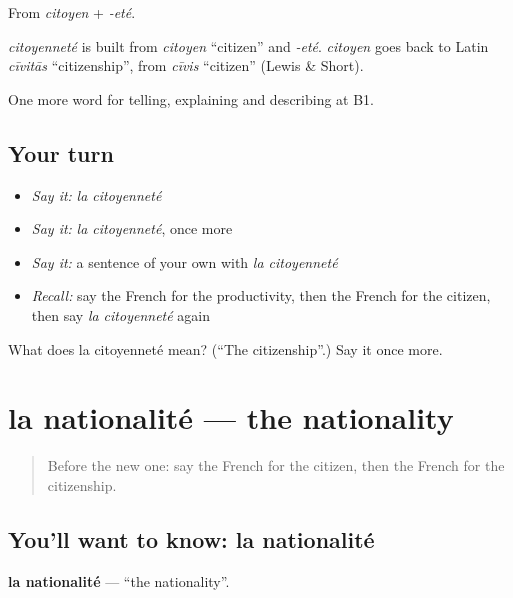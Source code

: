 From \emph{citoyen} + \emph{-eté}.

\begin{cousinweb}
\emph{citoyenneté} is built from \emph{citoyen} \textquotedblleft{}citizen\textquotedblright{} and \emph{-eté}. \emph{citoyen} goes back to Latin \emph{cīvitās} \textquotedblleft{}citizenship\textquotedblright{}, from \emph{cīvis} \textquotedblleft{}citizen\textquotedblright{} (Lewis \& Short).
\end{cousinweb}

\begin{grammarlens}[title={What you've built}]
One more word for telling, explaining and describing at B1.
\end{grammarlens}

\subsection*{Your turn}
\begin{itemize}
\raggedright
  \item \emph{Say it:} \emph{la citoyenneté}
  \item \emph{Say it:} \emph{la citoyenneté}, once more
  \item \emph{Say it:} a sentence of your own with \emph{la citoyenneté}
  \item \emph{Recall:} say the French for the productivity, then the French for the citizen, then say \emph{la citoyenneté} again
\end{itemize}

\begin{tcolorbox}[breakable,colback=teal!4,colframe=teal!35!black,title={Before you move on}]
What does la citoyenneté mean? (\textquotedblleft{}The citizenship\textquotedblright{}.) Say it once more.
\end{tcolorbox}
\section[la nationalité]{la nationalité — the nationality}

\label{lesson:FR-C362-nationalite}



\begin{quote}
Before the new one: say the French for the citizen, then the French for the citizenship.
\end{quote}

\subsection*{You'll want to know: la nationalité}
\textbf{la nationalité} — \textquotedblleft{}the nationality\textquotedblright{}.

